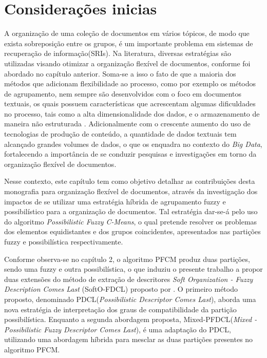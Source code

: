\section{Considerações inicias}

A organização de uma coleção de documentos em vários tópicos, de modo que exista sobreposição entre
os grupos, é um importante problema em sistemas de recuperação de informação(SRIs). Na literatura,
diversas estratégias são utilizadas visando otimizar a organização flexível de documentos, conforme
foi abordado no capítulo anterior. Soma-se a isso o fato de que a maioria dos métodos que adicionam
flexibilidade ao processo, como por exemplo  os métodos de agrupamento, nem sempre são desenvolvidos
com o foco em documentos textuais, os quais possuem características que acrescentam algumas
dificuldades no processo, tais como a alta dimensionalidade dos dados, e o armazenamento de maneira
não estruturada \cite{Steinbach2004}.  Adicionalmente com o crescente aumento do uso de tecnologias
de produção de conteúdo, a quantidade de dados textuais tem alcançado grandes volumes de dados, o
que os enquadra no contexto do {\it Big Data\/}, fortalecendo a importância de se conduzir pesquisas
e investigações em torno da organização flexível de documentos. 

Nesse contexto, este capítulo tem como objetivo detalhar as contribuições desta monografia para
organização flexível de documentos, através da investigação dos impactos de se utilizar uma
estratégia híbrida de agrupamento fuzzy e possibilístico para a organização de documentos. Tal
estratégia dar-se-á pelo uso do algoritmo {\it Possibilistic Fuzzy C-Means\/}, o qual pretende
resolver os problemas dos elementos equidistantes e dos grupos coincidentes, apresentados nas
partições fuzzy e possibilística respectivamente. 

Conforme observa-se no capítulo 2, o algoritmo PFCM produz duas partições, sendo uma fuzzy e outra
possibilística, o que induziu o presente trabalho a propor duas extensões do método de extração de
descritores {\it Soft Organization - Fuzzy Description Comes Last\/} (SoftO-FDCL) proposto por
. O primeiro método proposto, denominado PDCL({\it Possibilistic Descriptor
Comes Last\/}), aborda uma nova estratégia de interpretação dos graus de compatibilidade da partição
possibilística.  Enquanto a segunda abordagem proposta,  Mixed-PFDCL({\it Mixed - Possibilistic
Fuzzy Descriptor Comes Last\/}), é uma adaptação do PDCL, utilizando uma abordagem híbrida para
mesclar as duas partições presentes no algoritmo PFCM. 

